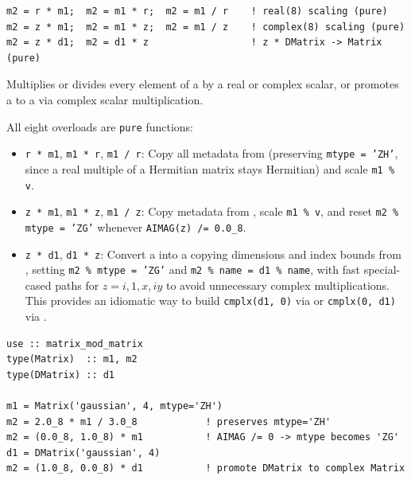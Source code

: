 \lstset{language=[95]Fortran}
\begin{lstlisting}
m2 = r * m1;  m2 = m1 * r;  m2 = m1 / r    ! real(8) scaling (pure)
m2 = z * m1;  m2 = m1 * z;  m2 = m1 / z    ! complex(8) scaling (pure)
m2 = z * d1;  m2 = d1 * z                  ! z * DMatrix -> Matrix (pure)
\end{lstlisting}

Multiplies or divides every element of a  by a real or complex scalar, or promotes a  to a  via complex scalar multiplication.

All eight overloads are \texttt{pure} functions:
\begin{itemize}
  \item \texttt{r * m1}, \texttt{m1 * r}, \texttt{m1 / r}: Copy all metadata from  (preserving \texttt{mtype = 'ZH'}, since a real multiple of a Hermitian matrix stays Hermitian) and scale \texttt{m1 \% v}.
  \item \texttt{z * m1}, \texttt{m1 * z}, \texttt{m1 / z}: Copy metadata from , scale \texttt{m1 \% v}, and reset \texttt{m2 \% mtype = 'ZG'} whenever \texttt{AIMAG(z) /= 0.0\_8}.
  \item \texttt{z * d1}, \texttt{d1 * z}: Convert a   into a   copying dimensions and index bounds from , setting \texttt{m2 \% mtype = 'ZG'} and \texttt{m2 \% name = d1 \% name}, with fast special-cased paths for $z = i, 1, x, iy$ to avoid unnecessary complex multiplications. This provides an idiomatic way to build \texttt{cmplx(d1, 0)} via  or \texttt{cmplx(0, d1)} via .
\end{itemize}

\begin{description}[leftmargin=2.2cm, style=nextline]
\end{description}

\lstset{language=[95]Fortran}
\begin{lstlisting}
use :: matrix_mod_matrix
type(Matrix)  :: m1, m2
type(DMatrix) :: d1

m1 = Matrix('gaussian', 4, mtype='ZH')
m2 = 2.0_8 * m1 / 3.0_8            ! preserves mtype='ZH'
m2 = (0.0_8, 1.0_8) * m1           ! AIMAG /= 0 -> mtype becomes 'ZG'
d1 = DMatrix('gaussian', 4)
m2 = (1.0_8, 0.0_8) * d1           ! promote DMatrix to complex Matrix
\end{lstlisting}

